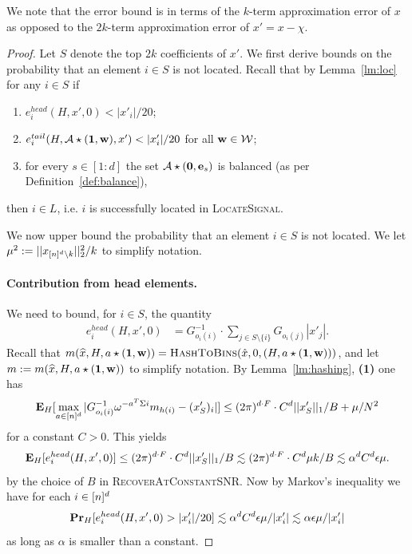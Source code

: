 \begin{remark}
We note that the error bound is in terms of the $k$-term approximation error of $x$ as opposed to the $2k$-term approximation error of $x'=x-\chi$.
\end{remark}
\begin{proof}
Let $S$ denote the top $2k$ coefficients of $x'$. We first derive bounds on the probability that an element $i\in S$ is not located.
Recall that by Lemma~\ref{lm:loc} for any $i\in S$ if
\begin{enumerate}
\item  $e^{head}_{i}(H, x', 0)<|x'_i|/20$;
\item  $e^{tail}_{i}(H, {\mathcal{A}}\star (\mathbf{1}, \mathbf{w}), x')< |x'_i|/20$ for all $\mathbf{w}\in \mathcal{W}$;
\item for every $s\in [1:d]$ the set ${\mathcal{A}}\star(\mathbf{0}, \mathbf{e}_s)$ is balanced (as per Definition~\ref{def:balance}),
\end{enumerate}
then $i\in L$, i.e. $i$ is successfully located in \textsc{LocateSignal}. 
  

We now upper bound the probability that an element $i\in S$ is not located.  We let $\mu^2:=||x_{{[n]^d}\setminus k}||_2^2/k$ to simplify notation.

\paragraph{Contribution from head elements.} We need to bound, for $i\in S$, the quantity
\begin{equation*}
\begin{split}
e^{head}_i(H, x', 0)&=G_{o_i(i)}^{-1}\cdot \sum_{j\in S\setminus \{i\}} G_{o_i(j)}|x'_j|.
\end{split}
\end{equation*}
Recall that $m(\wh{x}, H, a\star(\one, \h))=\Call{HashToBins}{\hat x, 0, (H, a\star (\one, \h))}$, and let $m:=m(\widehat{x}, H, a\star(\mathbf{1}, \mathbf{w}))$ to simplify notation. By Lemma~\ref{lm:hashing}, {\bf (1)} one has 
\begin{equation}\label{eq:const-h}
{\bf \mbox{\bf E}}_H[\max_{a\in {[n]^d}} |G_{o_i(i)}^{-1}\omega^{-a^T\Sigma i}m_{h(i)} - (x'_{S})_i|]\leq (2\pi)^{d\cdot F}\cdot C^d ||x'_{S}||_1/B+\mu/N^2
\end{equation}
for a constant $C>0$. This yields
$$
{\bf \mbox{\bf E}}_H[e^{head}_i(H, x', 0)]\leq (2\pi)^{d\cdot F} \cdot C^d ||x'_{S}||_1/B\lesssim  (2\pi)^{d\cdot F} \cdot C^d \mu k/B\lesssim \alpha^d C^d {\epsilon} \mu.
$$
by the choice of $B$ in \textsc{RecoverAtConstantSNR}. Now by Markov's inequality we have for each $i\in {[n]^d}$ 
\begin{equation}\label{eq:const-eh-prob}
{\bf \mbox{\bf Pr}}_H[e^{head}_{i}(H, x', 0)>|x'_i|/20]\lesssim \alpha^d C^d {\epsilon} \mu/|x'_i|\lesssim \alpha {\epsilon} \mu/|x'_i|
\end{equation}
as long as $\alpha$ is smaller than a constant.


\end{proof}
